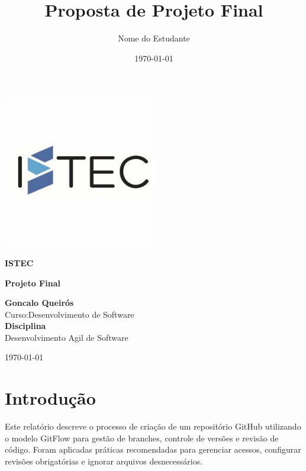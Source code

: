 \documentclass[a4paper,12pt]{article}
\title{\textbf{Proposta de Projeto Final}}
\author{Nome do Estudante}
\date{\today}
\begin{document}
\begin{titlepage}
    \centering
    \includegraphics[width=0.5\textwidth]{istec.jpeg}
    \vspace{1cm}

    {\LARGE \textbf{ISTEC} \par}
    \vspace{1.5cm}

    {\Large \textbf{Projeto Final} \par}
    \vspace{0.5cm}

    \textbf{Goncalo Queirós} \\
    Curso:Desenvolvimento de Software \\

    \textbf{Disciplina} \\
    Desenvolvimento Agil de Software \\

    \vfill

    {\large \today\par}
\end{titlepage}

\newpage
\tableofcontents
\newpage

\section{Introdução}
Este relatório descreve o processo de criação de um repositório GitHub utilizando o modelo GitFlow para gestão de branches, controle de versões e revisão de código. Foram aplicadas práticas recomendadas para gerenciar acessos, configurar revisões obrigatórias e ignorar arquivos desnecessários.
\end{document}

